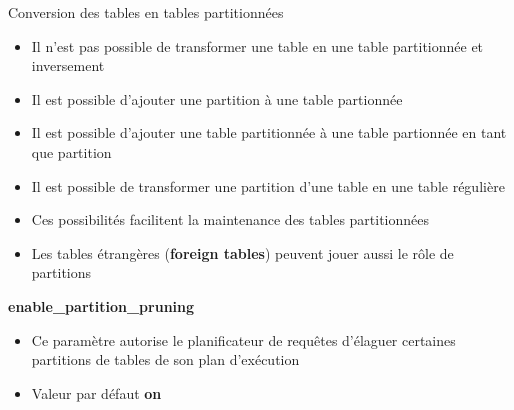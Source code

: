 \begin{frame}[fragile]{Conversion des tables en tables partitionnées}

   \begin{itemize}
      \item Il n'est pas possible de transformer une table en une table partitionnée et inversement
      \item Il est possible d'ajouter une partition à une table partionnée
      \item Il est possible d'ajouter une table partitionnée à une table partionnée en tant que partition
      \item Il est possible de transformer une partition d'une table en une table régulière
      \item Ces possibilités facilitent la maintenance des tables partitionnées
      \item Les tables étrangères (\textbf{foreign tables}) peuvent jouer aussi le rôle de partitions
   \end{itemize}

\begin{toile}
\end{toile}

\end{frame}


\begin{frame}[fragile]{\textbf{enable\_partition\_pruning}}

   \begin{itemize}
      \item Ce paramètre autorise le planificateur de requêtes d'élaguer certaines partitions de tables de son plan d'exécution
      \item Valeur par défaut \textbf{on}
   \end{itemize}

\begin{toile}
\end{toile}

\end{frame}



